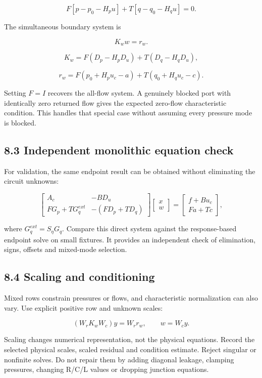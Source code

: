 \documentclass[11pt,a4paper]{article}
\begin{document}
\nopagebreak[3]
\[
F\left[p-p_0-H_pu\right]
+T\left[q-q_0-H_qu\right]=0.
\]


The simultaneous boundary system is


\nopagebreak[3]
\[
\boxed{K_w w=r_w.}
\]



\nopagebreak[3]
\[
K_w=F(D_p-H_pD_u)+T(D_q-H_qD_u),
\]



\nopagebreak[3]
\[
r_w=F(p_0+H_pu_c-a)+T(q_0+H_qu_c-c).
\]


Setting \(F = I\) recovers the all-flow system. A genuinely blocked port with identically zero returned flow gives the expected zero-flow characteristic condition. This handles that special case without assuming every pressure mode is blocked.

\subsection{8.3 Independent monolithic equation check}
For validation, the same endpoint result can be obtained without eliminating the circuit unknowns:


\nopagebreak[3]
\[
\begin{bmatrix}
A_c & -BD_u\\
FG_p+TG_q^{ext} & -(FD_p+TD_q)
\end{bmatrix}
\begin{bmatrix}x\\w\end{bmatrix}
=
\begin{bmatrix}
f+Bu_c\\Fa+Tc
\end{bmatrix},
\]


where \(G_q^{ext}=S_\eta G_q\). Compare this direct system against the response-based endpoint solve on small fixtures. It provides an independent check of elimination, signs, offsets and mixed-mode selection.

\subsection{8.4 Scaling and conditioning}
Mixed rows constrain pressures or flows, and characteristic normalization can also vary. Use explicit positive row and unknown scales:


\nopagebreak[3]
\[
(W_rK_wW_c)y=W_rr_w,\qquad w=W_cy.
\]


Scaling changes numerical representation, not the physical equations. Record the selected physical scales, scaled residual and condition estimate. Reject singular or nonfinite solves. Do not repair them by adding diagonal leakage, clamping pressures, changing R/C/L values or dropping junction equations.
\end{document}
